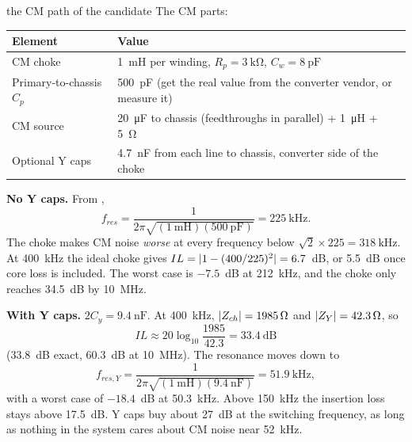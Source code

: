 \begin{examplebox}[label=ex:cm]{the CM path of the candidate}
	The CM parts:
	\begin{center}
		\small
		\begin{tabular}{@{}ll@{}}
			\toprule
			Element                    & Value                                                                                           \\
			\midrule
			CM choke                   & \qty{1}{\milli\henry} per winding, $R_p = \qty{3}{\kilo\ohm}$, $C_w = \qty{8}{\pico\farad}$     \\
			Primary-to-chassis $C_p$   & \qty{500}{\pico\farad} (get the real value from the converter vendor, or measure it)           \\
			CM source                  & \qty{20}{\micro\farad} to chassis (feedthroughs in parallel) + \qty{1}{\micro\henry} + \qty{5}{\ohm} \\
			Optional Y caps            & \qty{4.7}{\nano\farad} from each line to chassis, converter side of the choke                  \\
			\bottomrule
		\end{tabular}
	\end{center}

	\textbf{No Y caps.} From ,
	\[
		f_{res} = \frac{1}{2\pi\sqrt{(\qty{1}{\milli\henry})(\qty{500}{\pico\farad})}} = \qty{225}{\kHz}.
	\]
	The choke makes CM noise \emph{worse} at every frequency below
	$\sqrt{2} \times 225 = \qty{318}{\kHz}$. At \qty{400}{\kHz} the ideal choke
	gives $IL = \lvert1 - (400/225)^2\rvert = 6.7$~dB, or 5.5~dB once core loss is
	included. The worst case is $-7.5$~dB at \qty{212}{\kHz}, and the choke only
	reaches 34.5~dB by \qty{10}{\MHz}.

	\textbf{With Y caps.} $2C_y = \qty{9.4}{\nano\farad}$. At \qty{400}{\kHz},
	$\lvert Z_{ch}\rvert = \qty{1985}{\ohm}$ and $\lvert Z_Y\rvert = \qty{42.3}{\ohm}$, so
	\[
		IL \approx 20\log_{10}\frac{1985}{42.3} = 33.4~\text{dB}
	\]
	(33.8~dB exact, 60.3~dB at \qty{10}{\MHz}). The resonance moves down to
	\[
		f_{res,Y} = \frac{1}{2\pi\sqrt{(\qty{1}{\milli\henry})(\qty{9.4}{\nano\farad})}} = \qty{51.9}{\kHz},
	\]
	with a worst case of $-18.4$~dB at \qty{50.3}{\kHz}. Above \qty{150}{\kHz}
	the insertion loss stays above 17.5~dB. Y caps buy about 27~dB at the
	switching frequency, as long as nothing in the system cares about CM noise
	near \qty{52}{\kHz}.
\end{examplebox}
